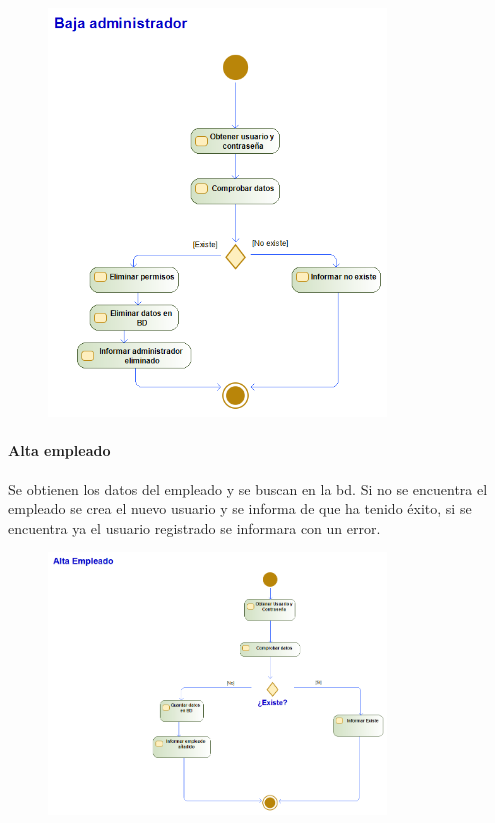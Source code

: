 \begin{figure}[H]
    \centering
    \includegraphics[width=0.8\textwidth]{Use_Cases/baja_admin.png}
\end{figure}
\newpage
\paragraph{Alta empleado}
Se obtienen los datos del empleado y se buscan en la \gls{bd}. Si no se encuentra el empleado se crea el nuevo usuario y se informa de que ha tenido éxito, si se encuentra ya el usuario registrado se informara con un error.
\begin{figure}[H]
    \centering
    \includegraphics[width=0.8\textwidth]{Use_Cases/Alta_empleado.png}
\end{figure}
\newpage
